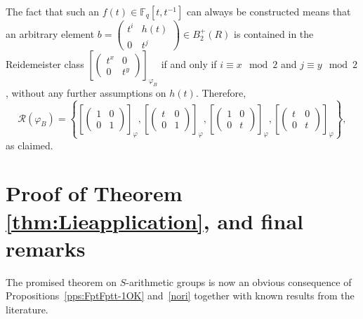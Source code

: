 \documentclass[a4paper,11pt]{amsart}
\makeatletter
\numberwithin{equation}{section}
\theoremstyle{plain}
\theoremstyle{definition}
\renewenvironment{proof}[1][\proofname] {\par\pushQED{\qed}\normalfont\topsep6\p@\@plus6\p@\relax\trivlist\item[\hskip\labelsep\bfseries#1\@addpunct{.}]\ignorespaces}{\popQED\endtrivlist\@endpefalse}
\newcommand{\F}{\mathbb{F}}
\newcommand{\phee}{\varphi} %
\makeatother
\begin{document}
\begin{proof}
The fact that such an $f(t) \in \F_q[t,t^{-1}]$ can always be constructed means that an arbitrary element $b=\left(\begin{smallmatrix} t^{i}&h(t)\\0&t^{j}\end{smallmatrix}\right) \in B_{2}^{+}(R)$ is contained in the Reidemeister class $\left[\left(\begin{smallmatrix} t^{x}&0\\0&t^{y}\end{smallmatrix}\right)\right]_{\phee_B}$ if and only if 
$i \equiv x \mod 2$ and $j \equiv y \mod 2$, without any further assumptions on $h(t)$. Therefore, 
\[\mathcal{R}(\phee_{B})=\left\{\left[\left(\begin{smallmatrix} 1&0\\0&1 \end{smallmatrix}\right)\right]_{\phee},\left[\left(\begin{smallmatrix} t&0\\0&1 \end{smallmatrix}\right)\right]_{\phee},\left[\left(\begin{smallmatrix} 1&0\\0&t \end{smallmatrix}\right)\right]_{\phee},\left[\left(\begin{smallmatrix} t&0\\0&t \end{smallmatrix}\right)\right]_{\phee}\right\},\]
as claimed.
\end{proof}

\section{Proof of Theorem \ref{thm:Lieapplication}, and final remarks} \label{sec:backtoarithmetic}

The promised theorem on $S$-arithmetic groups is now an obvious consequence of Propositions~\ref{pps:FptFptt-1OK} and~\ref{nori} together with known results from the literature.
\end{document}

